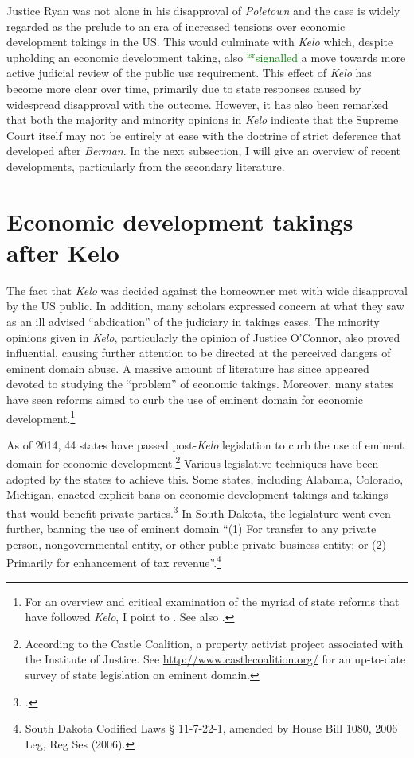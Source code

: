 \documentclass[12pt,a4paper]{book} %
\newcommand{\isr}[1]{\textcolor{green}{$^{\textrm{isr}}${#1}}}
\begin{document}
Justice Ryan was not alone in his disapproval of {\it Poletown} and the case is widely regarded as the prelude to an era of increased tensions over economic development takings in the US. This would culminate with {\it Kelo} which, despite upholding an economic development taking, also \isr{signalled} a move towards more active judicial review of the public use requirement. This effect of {\it Kelo} has become more clear over time, primarily due to state responses caused by widespread disapproval with the outcome. However, it has also been remarked that both the majority and minority opinions in {\it Kelo} indicate that the Supreme Court itself may not be entirely at ease with the doctrine of strict deference that developed after {\it Berman}. In the next subsection, I will give an overview of recent developments, particularly from the secondary literature.

\section{Economic development takings after Kelo}

The fact that {\it Kelo} was decided against the homeowner met with wide disapproval by the US public. In addition, many scholars expressed concern at what they saw as an ill advised ``abdication'' of the judiciary in takings cases. The minority opinions given in {\it Kelo}, particularly the opinion of Justice O'Connor, also proved influential, causing further attention to be directed at the perceived dangers of eminent domain abuse. A massive amount of literature has since appeared devoted to studying the ``problem'' of economic takings. Moreover,  many states have seen reforms aimed to curb the use of eminent domain for economic development.\footnote{For an overview and critical examination of the myriad of state reforms that have followed {\it Kelo}, I point to \cite{eagle08}. See also \cite{somin09}.} 

As of 2014, 44 states have passed post-{\it Kelo} legislation to curb the use of eminent domain for economic development.\footnote{According to the Castle Coalition, a property activist project associated with the Institute of Justice. See \url{http://www.castlecoalition.org/} for an up-to-date survey of state legislation on eminent domain.} Various legislative techniques have been adopted by the states to achieve this. Some states, including Alabama, Colorado, Michigan, enacted explicit bans on economic development takings and takings that would benefit private parties.\footcite[See][107-108]{eagle08} In South Dakota, the legislature went even further, banning the use of eminent domain  ``(1) For transfer to any private person, nongovernmental entity, or other public-private business entity; or (2) Primarily for enhancement of tax revenue''.\footnote{South Dakota Codified Laws § 11-7-22-1, amended by House Bill 1080, 2006 Leg, Reg Ses (2006).}
\end{document}
